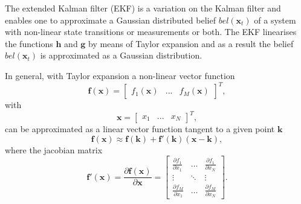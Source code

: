 \documentclass[12pt,oneside,openany,a4paper, %
afrikaans,english,
]{memoir}
\numberwithin{equation}{chapter}
\begin{document}
The extended Kalman filter (EKF) is a variation on the Kalman filter and enables one to approximate a Gaussian distributed belief $bel({\bm{x}_t})$ of a system with non-linear state transitions or measurements or both. The EKF linearises the functions $\bm{h}$ and $\bm{g}$ by means of Taylor expansion and as a result the belief $bel(\bm{x}_t)$ is approximated as a Gaussian distribution. 

In general, with Taylor expansion a non-linear vector function
\begin{equation}\label{eq: taylorLin}
\bm{f}(\bm{x}) =
\begin{bmatrix}
f_1(\bm{x}) & ... & f_M(\bm{x})
\end{bmatrix}^T,
\end{equation}
with
\begin{equation}
\bm{x} =
\begin{bmatrix}
x_1 & ... & x_N
\end{bmatrix}^T,
\end{equation}
can be approximated as a linear vector function tangent to a given point $\bm{k}$ 
\begin{equation}
\bm{f}(\bm{x}) \approx \bm{f}(\bm{k}) + \bm{f}'(\bm{k})(\bm{x-k}),
\end{equation}
where the jacobian matrix
\begin{equation}\label{eq:jacobian}
\bm{f}'(\bm{x}) = \frac{\partial\bm{f}(\bm{x})}{\partial \bm{x}} =
\begin{bmatrix}
\frac{\partial f_1}{\partial x_1} & \dots &\frac{\partial f_1}{\partial x_N}\\
\vdots & \ddots &\vdots\\
\frac{\partial f_M}{\partial x_1} & \dots &\frac{\partial f_M}{\partial x_N}
\end{bmatrix}.
\end{equation}
\end{document}
